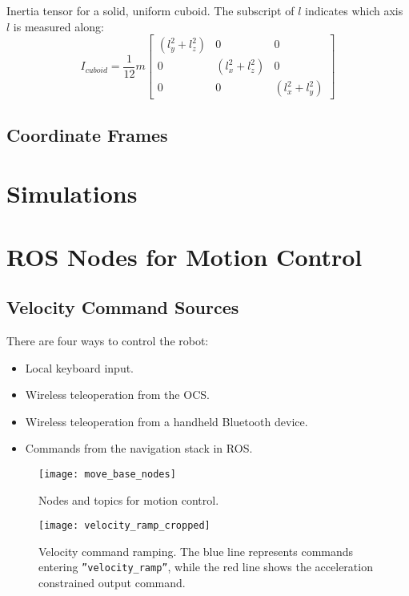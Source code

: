 Inertia tensor for a solid, uniform cuboid. The subscript of $l$ indicates which axis $l$ is measured along:
\begin{equation}
I_{cuboid} = \frac{1}{12}m \begin{bmatrix}
	(l_y^2 + l_z^2) & 0 & 0 \\[0.3em]
	0 & (l_x^2 + l_z^2) & 0 \\[0.3em]
	0 & 0 & (l_x^2 + l_y^2)
\end{bmatrix}
\end{equation}

\subsection{Coordinate Frames}

\section{Simulations}

\section{ROS Nodes for Motion Control}


\subsection{Velocity Command Sources}

There are four ways to control the robot:

\begin{itemize}
	\item Local keyboard input.
	\item Wireless teleoperation from the \ac{OCS}.
	\item Wireless teleoperation from a handheld Bluetooth device.
	\item Commands from the navigation stack in \ac{ROS}.
\end{itemize}

\begin{figure}[p]
	\centering
	\texttt{[image: move\_base\_nodes]}
	\caption{Nodes and topics for motion control. }
	\label{fig:move_base_nodes}
\end{figure}

\begin{figure}[p]
	\centering
	\texttt{[image: velocity\_ramp\_cropped]}
	\caption{Velocity command ramping. The blue line represents commands entering \texttt{''velocity\_ramp''}, while the red line shows the acceleration constrained output command.}
	\label{fig:velocity_ramp}
\end{figure}

